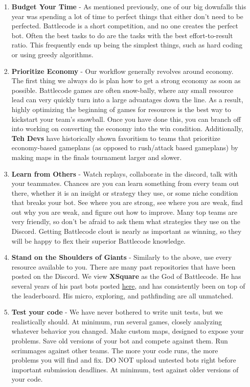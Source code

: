 \begin{enumerate}
\begin{itemize}
    
  \end{itemize}
  \item \textbf{Budget Your Time} - As mentioned previously, one of our big downfalls this year was spending a lot of time to perfect things that either don't need to be perfected. Battlecode is a short competition, and no one creates the perfect bot. Often the best tasks to do are the tasks with the best effort-to-result ratio. This frequently ends up being the simplest things, such as hard coding or using greedy algorithms.
  \item \textbf{Prioritize Economy} - Our workflow generally revolves around economy. The first thing we always do is plan how to get a strong economy as soon as possible. Battlecode games are often snow-bally, where any small resource lead can very quickly turn into a large advantages down the line. As a result, highly optimizing the beginning of games for resources is the best way to kickstart your team's snowball. Once you have done this, you can branch off into working on converting the economy into the win condition. Additionally, \textbf{Teh Devs} have historically shown favoritism to teams that prioritize economy-based gameplans (as opposed to rush/attack based gameplans) by making maps in the finals tournament larger and slower.
  \item \textbf{Learn from Others} - Watch replays, collaborate in the discord, talk with your teammates. Chances are you can learn something from every team out there, whether it is an insight or strategy they use, or some niche condition that breaks your bot. See where you are strong, see where you are weak, find out why you are weak, and figure out how to improve. Many top teams are very friendly, so don't be afraid to ask them what strategies they use on the Discord. Getting Battlecode clout is nearly as important as winning, so they will be happy to flex their superior Battlecode knowledge.
  \item \textbf{Stand on the Shoulders of Giants} - Similarly to the above, use every resource available to you. There are many past repositories that have been posted on the Discord. We view \textbf{XSquare} as the God of Battlecode. He has several years of his past bots posted \href{https://github.com/IvanGeffner}{here}, and has consistently been on top of the leaderboard. His micro, exploring, and pathfinding are all unmatched.
  \item \textbf{Test your code} - We have never bothered to write unit tests, but we realistically should. At minimum, run several games, closely analyzing whatever behavior you changed. Make custom maps, designed to expose your problems. Save old versions of your bot and compete against them. Run scrimmages against other teams. The more your code runs, the more problems you will find and fix. DO NOT upload untested bots right before important submission deadlines. At minimum, test against older versions of your code.

\end{enumerate}
